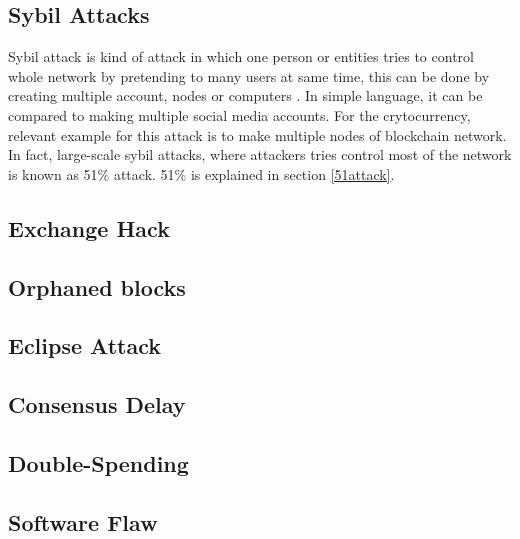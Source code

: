 \documentclass[a4paper,twoside,12pt]{report}
\begin{document}
\begin{spacing}{1.5}
\subsection{Sybil Attacks}
Sybil attack is kind of attack in which one person or entities tries to control whole network by pretending to many users at same time, this can be done by creating multiple account, nodes or computers \cite{zaghloul_beginners_2018}. In simple language, it can be compared to making multiple social media accounts. For the crytocurrency, relevant example for this attack is to make multiple nodes of blockchain network. In fact, large-scale sybil attacks, where attackers tries control most of the network is known as 51\% attack. 51\% is explained in section \ref{51attack}.
\subsection{Exchange Hack}
\cite{blockchainthreatreport}
\subsection{Orphaned blocks}
\cite{saad_exploring_2019}
\subsection{Eclipse Attack}
\cite{saad_exploring_2019}
\subsection{Consensus Delay}
\cite{saad_exploring_2019}
\subsection{Double-Spending}
\cite{saad_exploring_2019}
\subsection{Software Flaw}

\end{spacing}
\end{document}
